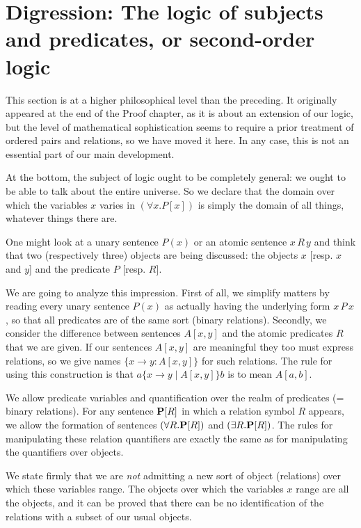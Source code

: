 \documentclass[12pt]{book}
\begin{document}
\newpage

\section{Digression:  The logic of subjects and predicates, or second-order logic}

This section is at a higher philosophical level than the preceding.  It originally appeared at the end of the Proof chapter, as it is about an extension of our logic, but the level of mathematical sophistication seems to require a prior treatment of ordered pairs and relations, so we have moved it here.  In any case, this is not an essential part of our main development.

At the bottom, the subject of logic ought to be completely general:  we ought to be able to talk about the entire universe.
So we declare that the domain over which the variables $x$ varies in $(\forall x.P[x])$ is simply the domain of all things, whatever things there are.

One might look at a unary sentence $P(x)$ or an atomic sentence $x\,R\,y$ and think that two (respectively three) objects are being discussed:
the objects $x$ [resp. $x$ and $y$] and the predicate $P$ [resp. $R$].  

We are going to analyze this impression.  First of all, we simplify matters by reading every unary sentence $P(x)$ as actually having the underlying
form $x\,P\,x$, so that all predicates are of the same sort (binary relations).  Secondly, we consider the difference between sentences
$A[x,y]$ and the atomic predicates $R$ that we are given.  If our sentences $A[x,y]$ are meaningful they too must express relations, so
we give names $\{x \rightarrow y : A[x,y]\}$ for such relations.  The rule for using this construction is that $a \{x \rightarrow y \mid A[x,y]\} b$
is to mean $A[a,b]$.

We allow predicate variables and quantification over the realm of predicates (= binary relations).  For any sentence ${\bf P}[R]$ in which a relation symbol $R$
appears, we allow the formation of sentences $(\forall R.{\bf P}[R])$ and $(\exists R.{\bf P}[R])$.  The rules for manipulating these relation quantifiers are exactly the same as for manipulating the quantifiers over objects.

We state firmly that we are {\em not\/} admitting a new sort of object (relations) over which these variables range.  The objects over which
the variables $x$ range are all the objects, and it can be proved that there can be no identification of the relations with a subset of our usual objects.
\end{document}
